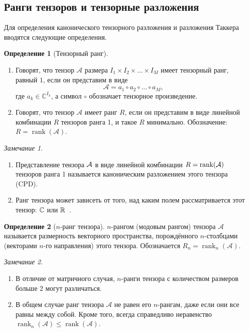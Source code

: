 \documentclass[specialist,
    substylefile = spbu.rtx,
    subf,href,colorlinks=true, 12pt]{disser}
\theoremstyle{plain}
\theoremstyle{definition}
\newtheorem{definition}{Определение}[section]
\theoremstyle{remark}
\newtheorem*{remark}{Замечание}
\begin{document}
    \subsection{Ранги тензоров и тензорные разложения}\label{subsec:tensor-ranks}
    Для определения канонического тензорного разложения и разложения Таккера вводятся следующие определения.
    \newpage
    \begin{definition}[Тензорный ранг]
        \leavevmode
        \begin{enumerate}
            \item Говорят, что тензор $\mathcal{A}$ размера $I_1\times I_2\times \ldots \times I_M$ имеет тензорный ранг, равный $1$, если он представим в виде
            \[
            \mathcal{A}=a_1\circ a_2\circ \ldots \circ a_M,
            \]
            где $a_{k} \in \mathbb{C}^{I_k}$, а символ $\circ$ обозначает тензорное произведение.
            \item Говорят, что тензор $\mathcal{A}$ имеет ранг $R$, если он представим в виде линейной комбинации $R$ тензоров
            ранга 1, и такое $R$ минимально.
            Обозначение: $R=\operatorname{rank}(\mathcal{A})$.
        \end{enumerate}
    \end{definition}
    \begin{remark}
        \begin{enumerate}
            \item Представление тензора $\mathcal{A}$ в виде линейной комбинации $R = \operatorname{rank}(\mathcal{A})$ тензоров ранга 1 называется каноническим разложением этого тензора (CPD).
            \item Ранг тензора может зависеть от того, над каким полем рассматривается этот тензор:
            $\mathbb{C}$ или $\mathbb{R}$~\cite{tensor-bg}.
        \end{enumerate}
    \end{remark}

    \begin{definition}[$n$-ранг тензора]
        $n$-рангом (модовым рангом) тензора $\mathcal{A}$ называется размерность векторного пространства, порождённого
        $n$-столбцами (векторами $n$-го направления) этого тензора.
        Обозначается $R_n=\operatorname{rank}_{n}(\mathcal{A})$.
    \end{definition}

    \begin{remark}
        \begin{enumerate}
            \item В отличие от матричного случая, $n$-ранги тензора с количеством размеров больше $2$ могут различаться.
            \item В общем случае ранг тензора $\mathcal{A}$ не равен его $n$-рангам, даже если они все равны между
            собой.
            Кроме того, всегда справедливо неравенство
            $\operatorname{rank}_n(\mathcal{A})\leqslant \operatorname{rank}(\mathcal{A})$.
        \end{enumerate}
    \end{remark}
\end{document}
